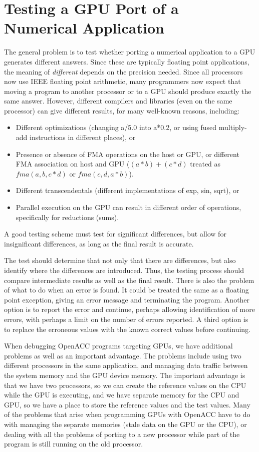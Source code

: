 \section{Testing a GPU Port of a Numerical Application}

The general problem is to test whether porting a numerical application to a GPU generates different answers.
Since these are typically floating point applications, the meaning of \emph{different} depends on the precision needed.
Since all processors now use IEEE floating point arithmetic\cite{goldberg.cs.91}, many programmers now expect that moving a program to another processor or to a GPU should produce exactly the same answer.
However, different compilers and libraries (even on the same processor) can give different results, for many well-known reasons, including:
\begin{itemize}
\item Different optimizations (changing a/5.0 into a*0.2, or using fused multiply-add instructions in different places), or
\item Presence or absence of FMA operations on the host or GPU, or different FMA association on host and GPU ($(a*b)+(c*d)$ treated as $\textit{fma}(a,b,c*d)$ or $\textit{fma}(c,d,a*b)$).
\item Different transcendentals (different implementations of exp, sin, sqrt), or
\item Parallel execution on the GPU can result in different order of operations, specifically for reductions (sums).
\end{itemize}
A good testing scheme must test for significant differences, but allow for insignificant differences, as long as the final result is accurate.

The test should determine that not only that there are differences, but also identify where the differences are introduced.
Thus, the testing process should compare intermediate results as well as the final result.
There is also the problem of what to do when an error is found.
It could be treated the same as a floating point exception, giving an error message and terminating the program.
Another option is to report the error and continue, perhaps allowing identification of more errors, with perhaps a limit on the number of errors reported.
A third option is to replace the erroneous values with the known correct values before continuing.

When debugging OpenACC programs targeting GPUs, we have additional problems as well as an important advantage.
The problems include using two different processors in the same application, and managing data traffic between the system memory and the GPU device memory.
The important advantage is that we have two processors, so we can create the reference values on the CPU while the GPU is executing, and we have separate memory for the CPU and GPU, so we have a place to store the reference values and the test values.
Many of the problems that arise when programming GPUs with OpenACC have to do with managing the separate memories (stale data on the GPU or the CPU), or dealing with all the problems of porting to a new processor while part of the program is still running on the old processor.

